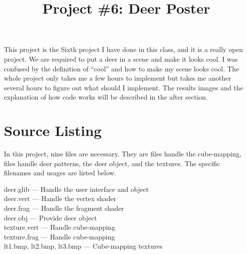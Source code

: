 \documentclass[letterpaper,14pt,titlepage,fleqn]{article}
\author{\name}
\title{Project \#6: Deer Poster}
\begin{document}
\maketitle

This project is the Sixth project I have done in this class, and it is a really open project. We are required to put a deer in a scene and make it looks cool. I was confused by the definition of ``cool'' and how to make my scene looks cool. The whole project only takes me a few hours to implement but takes me another several hours to figure out what should I implement. The results images and the explanation of how code works will be described in the after section. 

\section{Source Listing}
In this project, nine files are necessary. They are files handle the cube-mapping, files handle deer patterns, the deer object, and the textures. The specific filenames and usages are listed below.

deer.glib --- Handle the user interface and object\\
deer.vert --- Handle the vertex shader\\
deer.frag --- Handle the fragment shader\\
deer.obj --- Provide deer object\\
texture.vert --- Handle cube-mapping\\
texture.frag --- Handle cube-mapping\\
lt1.bmp, lt2.bmp, lt3.bmp --- Cube-mapping textures
\end{document}
